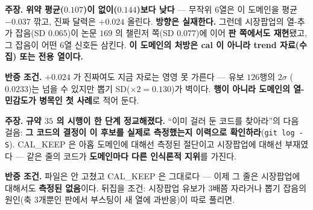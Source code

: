 \documentclass[10pt,a4paper]{article}
\newcommand{\claim}[2]{\begin{claimbox}\textbf{주장.} #1\par\smallskip
  \textcolor{gray!70}{\textbf{반증 조건.} #2}\end{claimbox}}
\begin{document}
\claim{\textbf{위약 평균($0.107$)이 없이($0.144$)보다 낮다} --- 무작위 $6$열은 이
도메인을 평균 $-0.037$ 깎고, 진짜 달력은 $+0.024$ 올린다. \textbf{방향은
실재한다.} 그런데 시장팝업의 열-추가 잡음(SD $0.065$)이 논문 $169$ 의 챌린저
쪽(SD $0.077$)에 이어 \textbf{판 쪽에서도 재현}됐고, 그 잡음이 어떤 $6$열
신호든 삼킨다. \textbf{이 도메인의 처방은 cal 이 아니라 trend 자료(수집) 또는
전용 열이다.}}
{$+0.024$ 가 진짜여도 지금 자로는 영영 못 가른다 --- 유보 $126$행의 $2\sigma$
($0.0233$)는 넘을 수 있지만 뽑기 SD($\times 2 = 0.130$)가 벽이다. \textbf{행이
아니라 도메인의 열-민감도가 병목인 첫 사례}로 적어 둔다.}

\claim{\textbf{규약 $35$ 의 시행이 한 단계 정교해졌다.} ``이미 걸러 둔 코드를
찾아라''의 다음 걸음: \textbf{그 코드의 결정이 이 후보를 실제로 측정했는지
이력으로 확인하라}(\texttt{git log -S}). CAL\_KEEP 은 아홉 도메인에 대해선 측정된
절단이고 시장팝업에 대해선 부재였다 --- 같은 줄의 코드가 \textbf{도메인마다 다른
인식론적 지위}를 가진다.}
{파일은 안 고쳤고 CAL\_KEEP 은 그대로다 --- 이제 그 줄은 시장팝업에 대해서도
\textbf{측정된 없음}이다. 뒤집을 조건: 시장팝업 유보가 $3$배쯤 자라거나 뽑기
잡음의 원인(축 $3$개뿐인 판에서 부스팅이 새 열에 과반응)이 따로 풀리면.}
\end{document}
